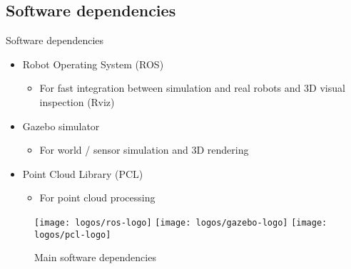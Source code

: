 \subsection{Software dependencies}
\begin{frame}{Software dependencies}
	\begin{itemize}
		\item Robot Operating System (ROS)
		\begin{itemize}
			\item For fast integration between simulation and real robots and 3D visual inspection (Rviz)
		\end{itemize}
		\item Gazebo simulator
		\begin{itemize}
			\item For world / sensor simulation and 3D rendering
		\end{itemize}
		\item Point Cloud Library (PCL)
		\begin{itemize}
			\item For point cloud processing
		\end{itemize}
	\end{itemize}
	\begin{figure}[!ht]
		\centering
		\texttt{[image: logos/ros-logo]}
		\hspace{1.5em}
		\texttt{[image: logos/gazebo-logo]}
		\hspace{1.5em}
		\texttt{[image: logos/pcl-logo]}
		\caption{Main software dependencies}
	\end{figure}
\end{frame}
